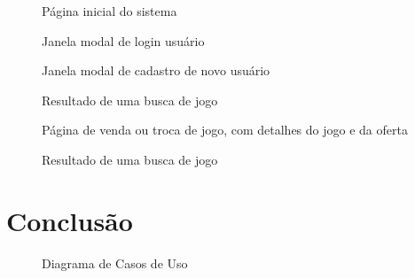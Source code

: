 \documentclass[a4paper,11pt]{article}
\begin{document}
\begin{figure}[!H]
    		\centering
        	\caption{Página inicial do sistema}
     		\label{home}
\end{figure}

\begin{figure}[!H]
    		\centering
        	\caption{Janela modal de login usuário}
     		\label{cadastro}
\end{figure}

\begin{figure}[!H]
    		\centering
        	\caption{Janela modal de cadastro de novo usuário}
     		\label{login}
\end{figure}

\begin{figure}[!H]
    		\centering
        	\caption{Resultado de uma busca de jogo}
     		\label{busca}
\end{figure}

\begin{figure}[!H]
    		\centering
        	\caption{Página de venda ou troca de jogo, com detalhes do jogo e da oferta}
     		\label{detalhe}
\end{figure}

\begin{figure}[!H]
    		\centering
        	\caption{Resultado de uma busca de jogo}
     		\label{diagrama}
\end{figure}

\section{Conclusão}

\begin{figure}[!H]
    		\centering
        	\caption{Diagrama de Casos de Uso}
     		\label{diagrama}
\end{figure}
    	
\end{document}
